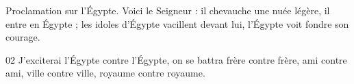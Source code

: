 Proclamation sur l’Égypte. Voici le Seigneur : il chevauche une nuée légère, il entre en Égypte ; les idoles d’Égypte vacillent devant lui, l’Égypte voit fondre son courage.

02 J’exciterai l’Égypte contre l’Égypte, on se battra frère contre frère, ami contre ami, ville contre ville, royaume contre royaume.
